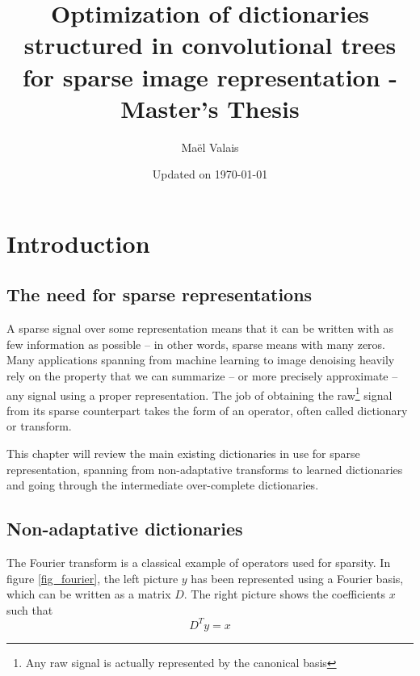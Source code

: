 


\author{Maël Valais}
\date{Updated on \today}
\title{Optimization of dictionaries structured in convolutional trees for sparse image representation - Master's Thesis}

\pagestyle{body}
\tableofcontents

\chapter{Introduction}

\section{The need for sparse representations}

A sparse signal over some representation means that it can be written with as few information as possible – in other words, sparse means with many zeros. Many applications spanning from machine learning to image denoising heavily rely on the property that we can summarize – or more precisely approximate – any signal using a proper representation. The job of obtaining the raw\footnote{Any raw signal is actually represented by the canonical basis} signal from its sparse counterpart takes the form of an operator, often called dictionary or transform.

This chapter will review the main existing dictionaries in use for sparse representation, spanning from non-adaptative transforms to learned dictionaries and going through the intermediate over-complete dictionaries.

\section{Non-adaptative dictionaries}

The Fourier transform is a classical example of operators used for sparsity. In figure \ref{fig_fourier}, the left picture $y$ has been represented using a Fourier basis, which can be written as a matrix $D$. The right picture shows the coefficients $x$ such that
$$D^Ty = x$$


